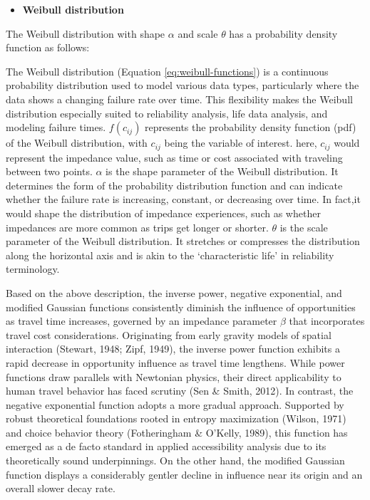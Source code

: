 \documentclass[
11pt, %
oneside, %
english, %
singlespacing, %
]{macthesis} %
\def\tightlist{}
\begin{document}
\begin{itemize}
\tightlist
\item
  \textbf{Weibull distribution}
\end{itemize}

The Weibull distribution with shape \(\alpha\) and scale \(\theta\) has a probability density function as follows:

The Weibull distribution (Equation \ref{eq:weibull-functions}) is a continuous probability distribution used to model various data types, particularly where the data shows a changing failure rate over time. This flexibility makes the Weibull distribution especially suited to reliability analysis, life data analysis, and modeling failure times. \(f(c_{ij})\) represents the probability density function (pdf) of the Weibull distribution, with \(c_{ij}\) being the variable of interest. here, \(c_{ij}\) would represent the impedance value, such as time or cost associated with traveling between two points. \(\alpha\) is the shape parameter of the Weibull distribution. It determines the form of the probability distribution function and can indicate whether the failure rate is increasing, constant, or decreasing over time. In fact,it would shape the distribution of impedance experiences, such as whether impedances are more common as trips get longer or shorter. \(\theta\) is the scale parameter of the Weibull distribution. It stretches or compresses the distribution along the horizontal axis and is akin to the `characteristic life' in reliability terminology.

Based on the above description, the inverse power, negative exponential, and modified Gaussian functions consistently diminish the influence of opportunities as travel time increases, governed by an impedance parameter \(\beta\) that incorporates travel cost considerations. Originating from early gravity models of spatial interaction (Stewart, 1948; Zipf, 1949), the inverse power function exhibits a rapid decrease in opportunity influence as travel time lengthens. While power functions draw parallels with Newtonian physics, their direct applicability to human travel behavior has faced scrutiny (Sen \& Smith, 2012). In contrast, the negative exponential function adopts a more gradual approach. Supported by robust theoretical foundations rooted in entropy maximization (Wilson, 1971) and choice behavior theory (Fotheringham \& O'Kelly, 1989), this function has emerged as a de facto standard in applied accessibility analysis due to its theoretically sound underpinnings. On the other hand, the modified Gaussian function displays a considerably gentler decline in influence near its origin and an overall slower decay rate.
\end{document}
